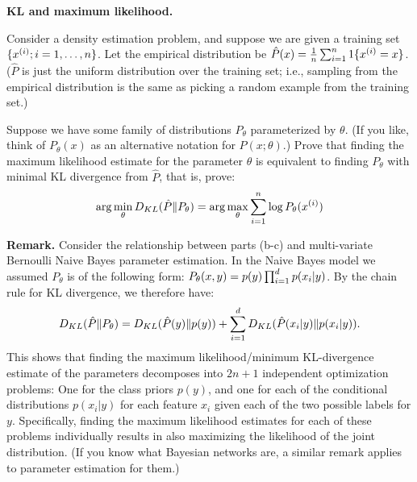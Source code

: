 \item{} \textbf{KL and maximum likelihood.}

Consider a density estimation problem, and suppose we are given a training set $\{x^{(i)}; i=1,\ldots, {n}\}$.  Let the empirical distribution be $\hat{P}(x) = \frac{1}{{n}}\sum_{i=1}^{{n}} 1\{x^{(i)}=x\}$. ($\hat{P}$ is just the uniform distribution over the training set; i.e., sampling from the empirical distribution is the same as picking a random example from the training set.)

Suppose we have some family of distributions $P_\theta$ parameterized by $\theta$.
(If you like, think of $P_\theta(x)$ as an alternative notation for $P(x;\theta)$.)
Prove that finding the maximum likelihood estimate for the parameter $\theta$ is equivalent to finding $P_{\theta}$ with minimal KL divergence from $\hat{P}$, that is, prove:
\[
\arg\min_\theta D_{KL}(\hat{P}\|P_\theta)
= \arg\max_\theta \sum_{i=1}^{n} \log P_\theta(x^{(i)})
\]

{\bf Remark.} Consider the relationship between parts (b-c) and multi-variate Bernoulli Naive Bayes parameter estimation. In the Naive Bayes model we assumed $P_\theta$ is of the following form: $P_{\theta}(x,y) = p(y)\prod_{i=1}^{{d}} p(x_i|y)$.  By the chain rule for KL divergence, we therefore have:
$$
D_{KL}(\hat{P}\|P_\theta)
= D_{KL}(\hat{P}(y)\|p(y)) + \sum_{i=1}^{{d}} D_{KL}(\hat{P}(x_i|y)\|p(x_i|y)).
$$
This shows that finding the maximum likelihood/minimum KL-divergence estimate of the parameters decomposes into $2n+1$ independent optimization problems: One for the class priors $p(y)$, and one for each of the conditional distributions $p(x_i|y)$ for each feature $x_i$ given each of the two possible labels for $y$.  Specifically, finding the maximum likelihood estimates for each of these problems individually results in also maximizing the likelihood of the joint distribution.  (If you know what Bayesian networks are, a similar remark applies to parameter estimation for them.)
